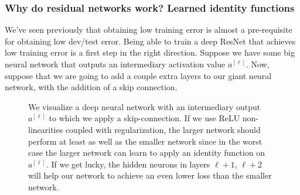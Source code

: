\documentclass[12pt]{article}
\begin{document}
\subsubsection{Why do residual networks work? Learned identity functions} 
We've seen previously that obtaining low training error
is almost a pre-requisite for obtaining low dev/test error. Being able to train a deep ResNet that achieves
low training error is a first step in the right direction. Suppose we have some big neural network that outputs
an intermediary activation value $a^{[\ell]}$.
Now, suppose that we are going to add a couple extra layers to our giant neural network, with the addition of a skip connection.
\begin{figure}[h]   \centering
  \caption{\footnotesize 
    We visualize a deep neural network with an intermediary output $a^{[\ell]}$ to which we apply a skip-connection.
    If we use ReLU non-linearities coupled with regularization, the larger network should perform at least as well as the smaller
    network since in the worst case the larger network can learn to apply an identity function on $a^{[\ell]}$. If we get lucky,
  the hidden neurons in layers $\ell+1$, $\ell+2$ will help our network to achieve an even lower loss than the smaller network.}
\end{figure}
\end{document}
